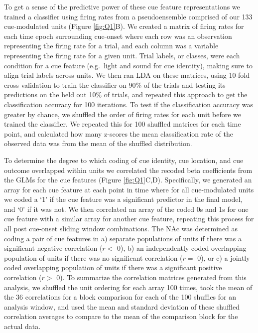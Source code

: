 \documentclass[11pt]{article}
\begin{document}
To get a sense of the predictive power of these cue feature representations we trained a classifier using firing rates from a pseudoensemble comprised of our 133 cue-modulated units (Figure \ref{fig:Q1}B). We created a matrix of firing rates for each time epoch surrounding cue-onset where each row was an observation representing the firing rate for a trial, and each column was a variable representing the firing rate for a given unit. Trial labels, or classes, were each condition for a cue feature (e.g.\ light and sound for cue identity), making sure to align trial labels across units. We then ran LDA on these matrices, using 10-fold cross validation to train the classifier on 90\% of the trials and testing its predictions on the held out 10\% of trials, and repeated this approach to get the classification accuracy for 100 iterations. To test if the classification accuracy was greater by chance, we shuffled the order of firing rates for each unit before we trained the classifier. We repeated this for 100 shuffled matrices for each time point, and calculated how many z-scores the mean classification rate of the observed data was from the mean of the shuffled distribution.

To determine the degree to which coding of cue identity, cue location, and cue outcome overlapped within units we correlated the recoded beta coefficients from the GLMs for the cue features (Figure \ref{fig:Q1}C,D). Specifically, we generated an array for each cue feature at each point in time where for all cue-modulated units we coded a `1' if the cue feature was a significant predictor in the final model, and `0' if it was not. We then correlated an array of the coded 0s and 1s for one cue feature with a similar array for another cue feature, repeating this process for all post cue-onset sliding window combinations. The NAc was determined as coding a pair of cue features in a) separate populations of units if there was a significant negative correlation ($r < $ 0), b) an independently coded overlapping population of units if there was no significant correlation ($r = $ 0), or c) a jointly coded overlapping population of units if there was a significant positive correlation ($r > $ 0). To summarize the correlation matrices generated from this analysis, we shuffled the unit ordering for each array 100 times, took the mean of the 36 correlations for a block comparison for each of the 100 shuffles for an analysis window, and used the mean and standard deviation of these shuffled correlation averages to compare to the mean of the comparison block for the actual data.
\end{document}
